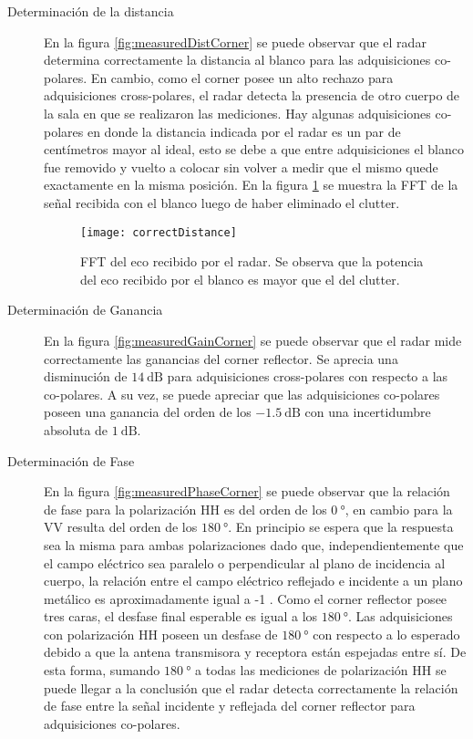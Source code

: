 \begin{description}
  \item[Determinación de la distancia] En la figura \ref{fig:measuredDistCorner} se puede observar que el radar determina correctamente la distancia al blanco para las adquisiciones co-polares. En cambio, como el corner posee un alto rechazo para adquisiciones cross-polares, el radar detecta la presencia de otro cuerpo de la sala en que se realizaron las mediciones. Hay algunas adquisiciones co-polares en donde la distancia indicada por el radar es un par de centímetros mayor al ideal, esto se debe a que entre adquisiciones el blanco fue removido y vuelto a colocar sin volver a medir que el mismo quede exactamente en la misma posición. En la figura \ref{fig:correctDistance} se muestra la FFT de la señal recibida con el blanco luego de haber eliminado el clutter.

  \begin{figure}[H]
    \centering
    \texttt{[image: correctDistance]}
    \caption{FFT del eco recibido por el radar. Se observa que la potencia del eco recibido por el blanco es mayor que el del clutter.}
    \label{fig:correctDistance}
  \end{figure}

  \item[Determinación de Ganancia] En la figura \ref{fig:measuredGainCorner} se puede observar que el radar mide correctamente las ganancias del corner reflector. Se aprecia una disminución de $\SI{14}{\dB}$ para adquisiciones cross-polares con respecto a las co-polares. A su vez, se puede apreciar que las adquisiciones co-polares poseen una ganancia del orden de los $\SI{-1.5}{\dB}$ con una incertidumbre absoluta de $\SI{1}{\dB}$.

  \item[Determinación de Fase] En la figura \ref{fig:measuredPhaseCorner} se puede observar que la relación de fase para la polarización HH es del orden de los $\SI{0}{\degree}$, en cambio para la VV resulta del orden de los $\SI{180}{\degree}$. En principio se espera que la respuesta sea la misma para ambas polarizaciones dado que, independientemente que el campo eléctrico sea paralelo o perpendicular al plano de incidencia al cuerpo, la relación entre el campo eléctrico reflejado e incidente a un plano metálico es aproximadamente igual a -1 \cite{Michelson1993}. Como el corner reflector posee tres caras, el desfase final esperable es igual a los $\SI{180}{\degree}$. Las adquisiciones con polarización HH poseen un desfase de $\SI{180}{\degree}$ con respecto a lo esperado debido a que la antena transmisora y receptora están espejadas entre sí. De esta forma, sumando $\SI{180}{\degree}$ a todas las mediciones de polarización HH se puede llegar a la conclusión que el radar detecta correctamente la relación de fase entre la señal incidente y reflejada del corner reflector para adquisiciones co-polares.


\end{description}

